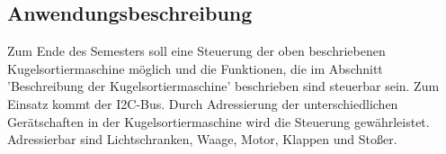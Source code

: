 \subsection{Anwendungsbeschreibung}
Zum Ende des Semesters soll eine Steuerung der oben beschriebenen Kugelsortiermaschine möglich und die Funktionen, die im Abschnitt 'Beschreibung der Kugelsortiermaschine' beschrieben sind steuerbar sein. Zum Einsatz kommt der I2C-Bus. Durch Adressierung der unterschiedlichen Gerätschaften in der Kugelsortiermaschine wird die Steuerung gewährleistet. Adressierbar sind Lichtschranken, Waage, Motor, Klappen und Stoßer.